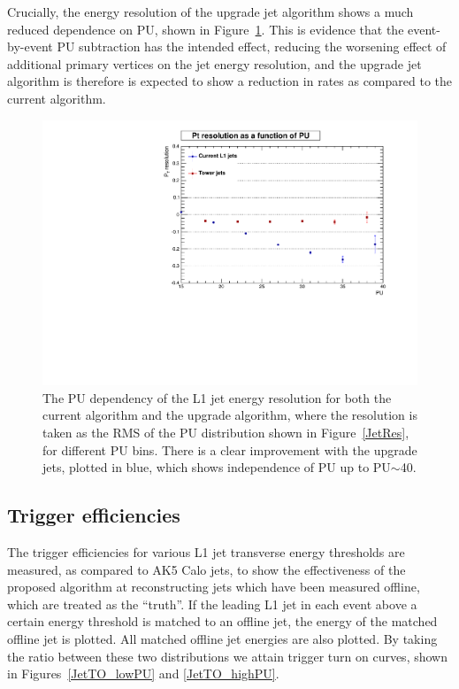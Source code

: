 Crucially, the energy resolution of the upgrade jet algorithm shows a much reduced dependence on \ac{PU}, shown in Figure~\ref{JetResPU}.
This is evidence that the event-by-event \ac{PU} subtraction has the intended effect, 
reducing the worsening effect of additional primary vertices on the jet energy resolution, 
and the upgrade jet algorithm is therefore is expected to show a reduction in rates as compared to the current algorithm.

\begin{figure}[t!]
\begin{center}
  \includegraphics[scale=0.52]{Figures/l1jets/Ptres_vsPU.pdf}
\caption{The \ac{PU} dependency of the \ac{L1} jet energy resolution for both the current algorithm and the upgrade algorithm, where the resolution is taken as the RMS of the PU distribution shown in Figure~\ref{JetRes}, for different \ac{PU} bins. There is a clear improvement with the upgrade jets, plotted in blue, which shows independence of \ac{PU} up to \ac{PU}$\sim$40.}
\label{JetResPU}
\end{center}
\end{figure}

\subsection{Trigger efficiencies}
The trigger efficiencies for various \ac{L1} jet transverse energy thresholds are measured, as compared to AK5 Calo jets, to show the effectiveness of the proposed algorithm at reconstructing jets which have been measured offline, which are treated as the ``truth''.
If the leading \ac{L1} jet in each event above a certain energy threshold is matched to an offline jet, the energy of the matched offline jet is plotted. 
All matched offline jet energies are also plotted. 
By taking the ratio between these two distributions we attain trigger turn on curves, shown in Figures~\ref{JetTO_lowPU} and \ref{JetTO_highPU}.

